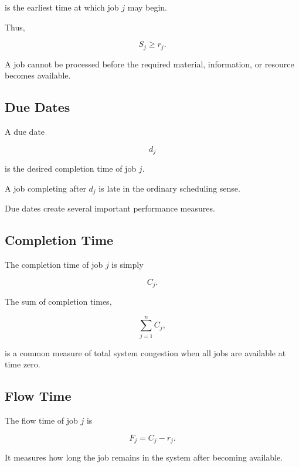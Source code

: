 is the earliest time at which job \(j\) may begin.

Thus,

\[
\boxed{
S_j
\geq
r_j.
}
\]

A job cannot be processed before the required material, information, or
resource becomes available.

\subsection{Due Dates}
\label{subsec:scheduling-due-dates}

A due date

\[
\boxed{
d_j
}
\]

is the desired completion time of job \(j\).

A job completing after \(d_j\) is late in the ordinary scheduling sense.

Due dates create several important performance measures.

\subsection{Completion Time}
\label{subsec:scheduling-completion-time}

The completion time of job \(j\) is simply

\[
\boxed{
C_j.
}
\]

The sum of completion times,

\[
\boxed{
\sum_{j=1}^{n}
C_j,
}
\]

is a common measure of total system congestion when all jobs are available
at time zero.

\subsection{Flow Time}
\label{subsec:scheduling-flow-time}

The flow time of job \(j\) is

\[
\boxed{
F_j
=
C_j-r_j.
}
\]

It measures how long the job remains in the system after becoming
available.

